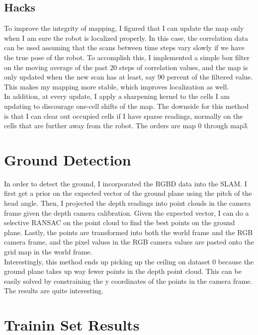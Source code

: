 \documentclass[english]{article}
\begin{document}
\subsection*{Hacks}
To improve the integrity of mapping, I figured that I can update the map only when I am sure the robot is localized properly. In this case, the correlation data can be used assuming that the scans between time steps vary slowly if we have the true pose of the robot. To accomplish this, I implemented a simple box filter on the moving average of the past 20 steps of correlation values, and the map is only updated when the new scan has at least, say 90 percent of the filtered value. This makes my mapping more stable, which improves localization as well.\\
In addition, at every update, I apply a sharpening kernel to the cells I am updating to discourage one-cell shifts of the map. The downside for this method is that I can clear out occupied cells if I have sparse readings, normally on the cells that are further away from the robot. The orders are map 0 through map3. 
\section*{Ground Detection}
In order to detect the ground, I incorporated the RGBD data into the SLAM. I first get a prior on the expected vector of the ground plane using the pitch of the head angle. Then, I projected the depth readings into point clouds in the camera frame given the depth camera calibration. Given the expected vector, I can do a selective RANSAC on the point cloud to find the best points on the ground plane. Lastly, the points are transformed into both the world frame and the RGB camera frame, and the pixel values in the RGB camera values are pasted onto the grid map in the world frame.\\
Interestingly, this method ends up picking up the ceiling on dataset 0 because the ground plane takes up way fewer points in the depth point cloud. This can be easily solved by constraining the y coordinates of the points in the camera frame. The results are quite interesting. 
\section*{Trainin Set Results}
\end{document}
